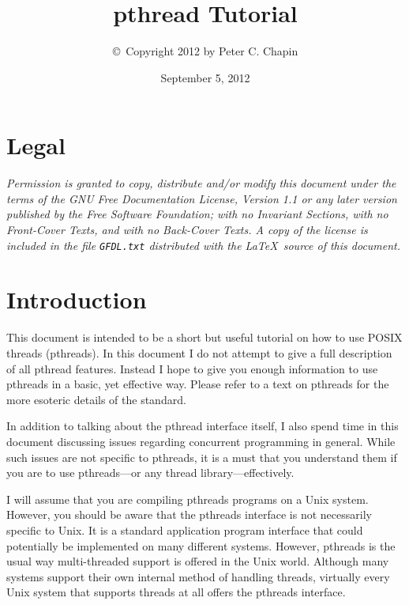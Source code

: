 \documentclass{article}
\begin{document}
\lstset{language=C,
        basicstyle=\small,
        stringstyle=\ttfamily,
        commentstyle=\ttfamily,
        xleftmargin=0.25in,
        showstringspaces=false}

\title{pthread Tutorial}
\author{\copyright\ Copyright 2012 by Peter C. Chapin}
\date{September 5, 2012}
\maketitle

\tableofcontents

\section*{Legal}
\label{sec:legal}

\textit{Permission is granted to copy, distribute and/or modify this document under the terms of
  the GNU Free Documentation License, Version 1.1 or any later version published by the Free
  Software Foundation; with no Invariant Sections, with no Front-Cover Texts, and with no
  Back-Cover Texts. A copy of the license is included in the file \texttt{GFDL.txt} distributed
  with the \LaTeX\ source of this document.}

\section{Introduction}
\label{sec:intro}

This document is intended to be a short but useful tutorial on how to use POSIX threads
(pthreads). In this document I do not attempt to give a full description of all pthread
features. Instead I hope to give you enough information to use pthreads in a basic, yet
effective way. Please refer to a text on pthreads for the more esoteric details of the standard.

In addition to talking about the pthread interface itself, I also spend time in this document
discussing issues regarding concurrent programming in general. While such issues are not
specific to pthreads, it is a must that you understand them if you are to use pthreads---or any
thread library---effectively.

I will assume that you are compiling pthreads programs on a Unix system. However, you should be
aware that the pthreads interface is not necessarily specific to Unix. It is a standard
application program interface that could potentially be implemented on many different systems.
However, pthreads is the usual way multi-threaded support is offered in the Unix world. Although
many systems support their own internal method of handling threads, virtually every Unix system
that supports threads at all offers the pthreads interface.
\end{document}
